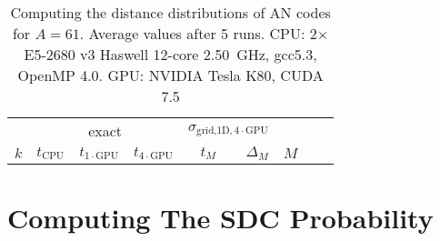 
\begin{table}%
	\centering
	\renewcommand{\arraystretch}{1.2}
	\begin{tabular}{@{}lrrrrrrrr@{}}
		\toprule
		& \multicolumn{3}{c}{exact} & \multicolumn{2}{c}{$\sigma_{\text{grid,1D},4\cdot\mathrm{GPU}}$} & 
		\\[-\aboverulesep]
		\arrayrulecolor[gray]{0.5}\cmidrule(lr){2-4}\cmidrule(lr){5-6}\arrayrulecolor{black}
		$k$ & $t_{\mathrm{CPU}}$ & $t_{1\cdot\mathrm{GPU}}$ & $t_{4\cdot\mathrm{GPU}}$ & $t_M$ & $\Delta_M$ & $M$\\
		\midrule
		
		\bottomrule
	\end{tabular}
	\caption{Computing the distance distributions of AN codes for \(A=61\). Average values after 5 runs.
CPU: 2$\times$E5-2680 v3 Haswell 12-core \SI[round-precision=2]{2.50}{GHz}, gcc5.3, OpenMP 4.0. GPU: NVIDIA Tesla K80, CUDA 7.5}
	\label{tab:runtimes}
	\vspace{-3em}
\end{table}

\section{Computing The SDC Probability}
\label{appendix:SDCProbability}

